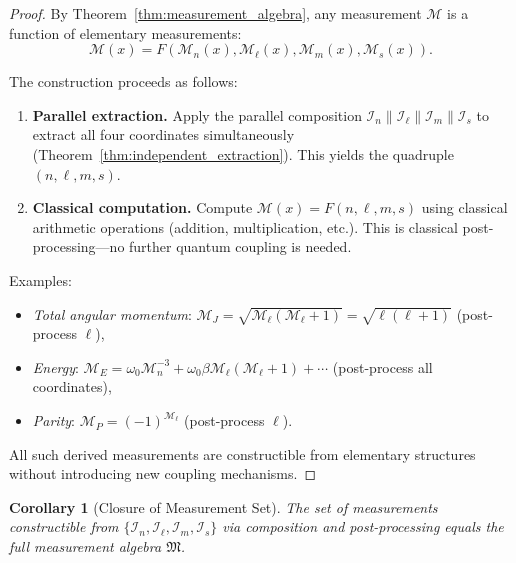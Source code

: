 \documentclass[twocolumn,10pt,a4paper]{article}
\newtheorem{corollary}[theorem]{Corollary}
\theoremstyle{remark}
\begin{document}
\begin{proof}
By Theorem~\ref{thm:measurement_algebra}, any measurement $\mathcal{M}$ is a function of elementary measurements:
\begin{equation}
\mathcal{M}(x) = F(\mathcal{M}_n(x), \mathcal{M}_\ell(x), \mathcal{M}_m(x), \mathcal{M}_s(x)).
\end{equation}

The construction proceeds as follows:
\begin{enumerate}[label=\textbf{Step \arabic*:}, leftmargin=*]
    \item \textbf{Parallel extraction.} Apply the parallel composition $\mathcal{I}_n \parallel \mathcal{I}_\ell \parallel \mathcal{I}_m \parallel \mathcal{I}_s$ to extract all four coordinates simultaneously (Theorem~\ref{thm:independent_extraction}). This yields the quadruple $(n, \ell, m, s)$.
    
    \item \textbf{Classical computation.} Compute $\mathcal{M}(x) = F(n, \ell, m, s)$ using classical arithmetic operations (addition, multiplication, etc.). This is classical post-processing—no further quantum coupling is needed.
\end{enumerate}

Examples:
\begin{itemize}[noitemsep]
    \item \emph{Total angular momentum}: $\mathcal{M}_J = \sqrt{\mathcal{M}_\ell(\mathcal{M}_\ell + 1)} = \sqrt{\ell(\ell+1)}$ (post-process $\ell$),
    \item \emph{Energy}: $\mathcal{M}_E = \omega_0 \mathcal{M}_n^{-3} + \omega_0 \beta \mathcal{M}_\ell(\mathcal{M}_\ell + 1) + \cdots$ (post-process all coordinates),
    \item \emph{Parity}: $\mathcal{M}_P = (-1)^{\mathcal{M}_\ell}$ (post-process $\ell$).
\end{itemize}

All such derived measurements are constructible from elementary structures without introducing new coupling mechanisms.
\end{proof}

\begin{corollary}[Closure of Measurement Set]
\label{cor:closure}
The set of measurements constructible from $\{\mathcal{I}_n, \mathcal{I}_\ell, \mathcal{I}_m, \mathcal{I}_s\}$ via composition and post-processing equals the full measurement algebra $\mathfrak{M}$.
\end{corollary}
\end{document}
